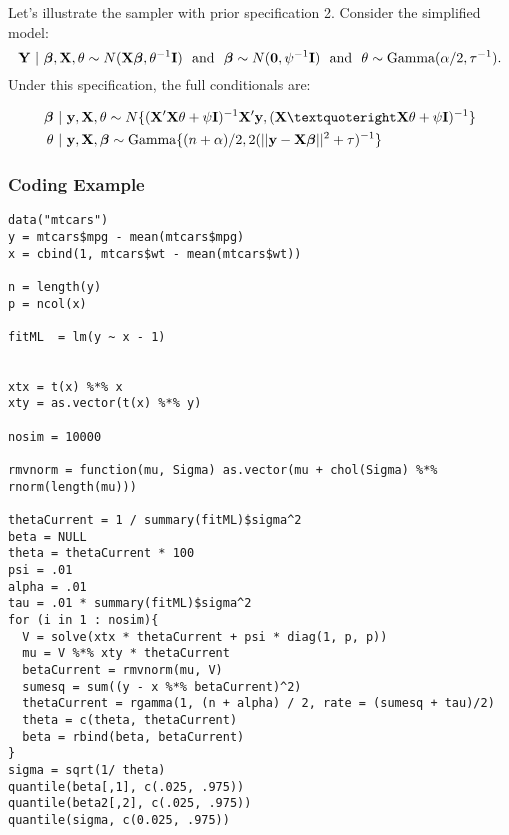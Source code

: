Let's illustrate the sampler with prior specification 2. Consider the
simplified model:
$$
\mathbf{Y} ~|~ \boldsymbol{\beta}, \mathbf{X}, \theta \sim N(\mathbf{X} \boldsymbol{\beta}, \theta^{-1}\mathbf{I})
~~\mbox{and}~~
\boldsymbol{\beta} \sim N(\mathbf{0}, \psi^{-1} \mathbf{I})
~~\mbox{and}~~
\theta \sim \mbox{Gamma}(\alpha / 2, \tau^{-1}).
$$
Under this specification, the full conditionals are:

\begin{align*}
\bbeta & ~|~  \by, \bX, \theta \sim N\{(\bfX'\bfX \theta + \psi \bI)^{-1} \bX'\by, (\xtx \theta + \psi \bI)^{-1}\} \\
\theta & ~|~ \by, \bX, \bbeta \sim \mbox{Gamma}\{(n + \alpha) / 2, 2(||\by - \bX \bbeta||^2 + \tau)^{-1} \}
\end{align*}


\subsubsection{Coding Example}

\begin{verbatim}
data("mtcars")
y = mtcars$mpg - mean(mtcars$mpg)
x = cbind(1, mtcars$wt - mean(mtcars$wt))

n = length(y)
p = ncol(x)

fitML  = lm(y ~ x - 1)


xtx = t(x) %*% x
xty = as.vector(t(x) %*% y)

nosim = 10000

rmvnorm = function(mu, Sigma) as.vector(mu + chol(Sigma) %*% rnorm(length(mu)))

thetaCurrent = 1 / summary(fitML)$sigma^2
beta = NULL
theta = thetaCurrent * 100
psi = .01
alpha = .01
tau = .01 * summary(fitML)$sigma^2
for (i in 1 : nosim){
  V = solve(xtx * thetaCurrent + psi * diag(1, p, p))  
  mu = V %*% xty * thetaCurrent
  betaCurrent = rmvnorm(mu, V)
  sumesq = sum((y - x %*% betaCurrent)^2)
  thetaCurrent = rgamma(1, (n + alpha) / 2, rate = (sumesq + tau)/2)
  theta = c(theta, thetaCurrent)
  beta = rbind(beta, betaCurrent)
}
sigma = sqrt(1/ theta)
quantile(beta[,1], c(.025, .975))
quantile(beta2[,2], c(.025, .975))
quantile(sigma, c(0.025, .975))
\end{verbatim}


